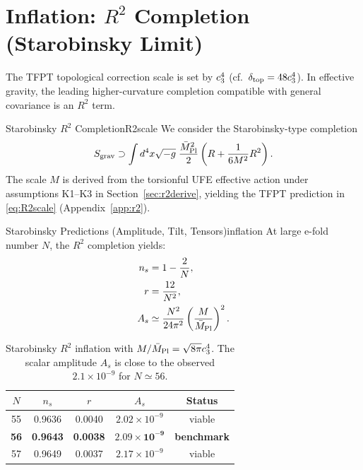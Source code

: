 \section{Inflation: $R^2$ Completion (Starobinsky Limit)}

The TFPT topological correction scale is set by $c_3^4$ (cf.\ $\delta_{\mathrm{top}} = 48c_3^4$). 
In effective gravity, the leading higher-curvature completion compatible with general covariance is an $R^2$ term.

\begin{definition}{Starobinsky $R^2$ Completion}{R2scale}
We consider the Starobinsky-type completion
\begin{equation}
    S_{\text{grav}} \supset \int d^4x\sqrt{-g}\;\frac{\bar{M}_{\mathrm{Pl}}^2}{2}\left(R + \frac{1}{6M^2}R^2\right).
    \label{eq:R2action}
\end{equation}
The scale $M$ is derived from the torsionful UFE effective action under
assumptions K1--K3 in Section~\ref{sec:r2derive}, yielding the TFPT prediction in
\eqref{eq:R2scale} (Appendix~\ref{app:r2}).
\end{definition}

\begin{theorem}{Starobinsky Predictions (Amplitude, Tilt, Tensors)}{inflation}
At large e-fold number $N$, the $R^2$ completion yields:
\begin{align}
    n_s &= 1 - \frac{2}{N}, \label{eq:ns}\\
    r &= \frac{12}{N^2}, \label{eq:r}\\
    A_s &\simeq \frac{N^2}{24\pi^2}\left(\frac{M}{\bar{M}_{\mathrm{Pl}}}\right)^2. \label{eq:As}
\end{align}
\end{theorem}

\begin{table}[H]
\centering
\begin{tabular}{@{}ccccc@{}}
\toprule
$N$ & $n_s$ & $r$ & $A_s$ & \textbf{Status}\\
\midrule
55 & 0.9636 & 0.0040 & $2.02\times10^{-9}$ & viable\\
\textbf{56} & \textbf{0.9643} & \textbf{0.0038} & $\mathbf{2.09\times10^{-9}}$ & \textbf{benchmark}\\
57 & 0.9649 & 0.0037 & $2.17\times10^{-9}$ & viable\\
\bottomrule
\end{tabular}
\caption{Starobinsky $R^2$ inflation with $M/\bar{M}_{\mathrm{Pl}}=\sqrt{8\pi}c_3^4$. The scalar amplitude $A_s$ is close to the observed $2.1\times10^{-9}$ for $N\simeq 56$.}
\label{tab:inflation}
\end{table}

